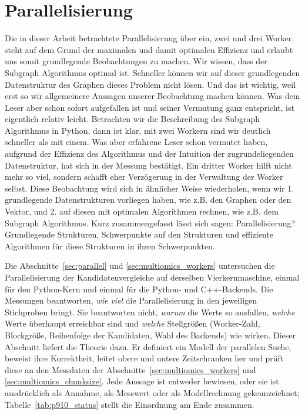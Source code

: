 \documentclass[a4paper,12pt, twoside]{report}
\theoremstyle{definition}
\begin{document}
\section{Parallelisierung}
\label{sec:par910}
Die in dieser Arbeit betrachtete Parallelisierung über ein, zwei und drei Worker steht auf dem Grund der maximalen und damit optimalen Effizienz und erlaubt uns somit grundlegende Beobachtungen zu machen. Wir wissen, dass der Subgraph Algorithmus optimal ist. Schneller können wir auf dieser grundlegenden Datenstruktur des Graphen dieses Problem nicht lösen. Und das ist wichtig, weil erst so wir allgemeinere Aussagen unserer Beobachtung machen können. Was dem Leser aber schon sofort aufgefallen ist und seiner Vermutung ganz entspricht, ist eigentlich relativ leicht. Betrachten wir die Beschreibung des Subgraph Algorithmus in Python, dann ist klar, mit zwei Workern sind wir deutlich schneller als mit einem. Was aber erfahrene Leser schon vermutet haben, aufgrund der Effizienz des Algorithmus und der Intuition der zugrundeliegenden Datenstruktur, hat sich in der Messung bestätigt. Ein dritter Worker hilft nicht mehr so viel, sondern schafft eher Verzögerung in der Verwaltung der Worker selbst. Diese Beobachtung wird sich in ähnlicher Weise wiederholen, wenn wir 1. grundlegende Datenstrukturen vorliegen haben, wie z.B. den Graphen oder den Vektor, und 2. auf diesen mit optimalen Algorithmen rechnen, wie z.B. dem Subgraph Algorithmus. Kurz zusammengefasst lässt sich sagen: Parallelisierung? Grundlegende Strukturen, Schwerpunkte auf den Strukturen und effiziente Algorithmen für diese Strukturen in ihren Schwerpunkten.

Die Abschnitte~\ref{sec:parallel} und \ref{sec:multiomics_workers} untersuchen die Parallelisierung der Kandidatenvergleiche auf derselben Vierkernmaschine, einmal für den Python-Kern und einmal für die Python- und C++-Backends. Die Messungen beantworten, \emph{wie viel} die Parallelisierung in den jeweiligen Stichproben bringt. Sie beantworten nicht, \emph{warum} die Werte so ausfallen, \emph{welche} Werte überhaupt erreichbar sind und \emph{welche} Stellgrößen (Worker-Zahl, Blockgröße, Reihenfolge der Kandidaten, Wahl des Backends) wie wirken. Dieser Abschnitt liefert die Theorie dazu. Er definiert ein Modell der parallelen Suche, beweist ihre Korrektheit, leitet obere und untere Zeitschranken her und prüft diese an den Messdaten der Abschnitte~\ref{sec:multiomics_workers} und \ref{sec:multiomics_chunksize}. Jede Aussage ist entweder bewiesen, oder sie ist ausdrücklich als Annahme, als Messwert oder als Modellrechnung gekennzeichnet; Tabelle~\ref{tab:p910_status} stellt die Einordnung am Ende zusammen.
\end{document}

